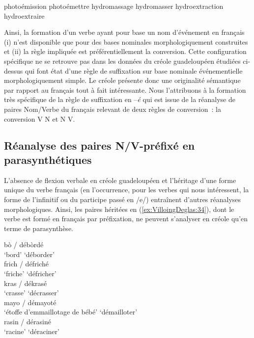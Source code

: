 \documentclass[output=paper]{langsci/langscibook}
\begin{document}
\ea \label{ex:VilloingDeglas:33}
\ea photoémission \textrightarrow{} photoémettre
\ex  hydromassage \textrightarrow{} hydromasser
\ex  hydroextraction \textrightarrow{} hydroextraire
\z\z

Ainsi, la formation d'un verbe ayant pour base un nom d'événement en
français (i) n'est disponible que pour des bases nominales
morphologiquement construites et (ii) la règle impliquée est
préférentiellement la conversion. Cette configuration spécifique ne se
retrouve pas dans les données du créole guadeloupéen étudiées ci-dessus
qui font état d'une règle de suffixation sur base nominale
événementielle morphologiquement simple. Le créole présente donc une
originalité sémantique par rapport au français tout à fait intéressante.
Nous l'attribuons à la formation très spécifique de la règle de
suffixation en --\emph{é} qui est issue de la réanalyse de paires
Nom/Verbe du français relevant de deux règles de conversion~: la
conversion V\textrightarrow{} N et N\textrightarrow{} V.

\subsection{Réanalyse des paires N/V-préfixé en
parasynthétiques}\label{subsection:VilloingDeglas:réanalyse-des-paires-nv-de-préfixé-en-parasynthétiques}

L'absence de flexion verbale en créole guadeloupéen et l'héritage d'une
forme unique du verbe français (en l'occurrence, pour les verbes qui
nous intéressent, la forme de l'infinitif ou du participe passé en /e/)
entraînent d'autres réanalyses morphologiques. Ainsi, les paires héritées
en (\ref{ex:VilloingDeglas:34}), dont le verbe est formé en français par préfixation, ne peuvent
s'analyser en créole qu'en terme de parasynthèse.

\ea \label{ex:VilloingDeglas:34}
      \ea \gll bò / débòrdé\\
        {`bord'} {} {`déborder'}\\
      \ex \gll  frich / défriché\\
        {`friche'} {} {`défricher'}\\
      \ex \gll  kras / dékrasé\\
        {`crasse'} {} {`décrasser'}\\
      \ex \gll  mayo / démayoté\\
        {`étoffe d'emmaillotage de bébé'} {} {`démailloter'}\\
      \ex \gll  rasin / dérasiné\\
        {`racine'} {} {`déraciner'}\\
      \z
\z
\end{document}
